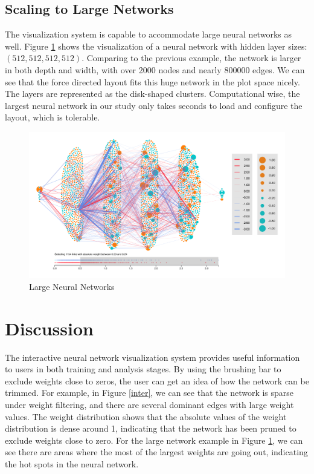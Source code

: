 \documentclass[sigchi]{acmart}
\begin{document}
\subsection{Scaling to Large Networks}
The visualization system is capable to accommodate large neural networks as well. Figure \ref{max} shows the visualization of a neural network with hidden layer sizes: $( 512, 512, 512, 512)$. Comparing to the previous example, the network is larger in both depth and width, with over 2000 nodes and nearly 800000 edges. We can see that the force directed layout fits this huge network in the plot space nicely. The layers are represented as the disk-shaped clusters. Computational wise, the largest neural network in our study only takes seconds to load and configure the layout, which is tolerable.

\begin{figure}[h]
  \centering
  \includegraphics[width=\linewidth]{NNmax1.png}
  \caption{Large Neural Networks}
  \label{max}
\end{figure}

\section{Discussion}
The interactive neural network visualization system provides useful information to users in both training and analysis stages. By using the brushing bar to exclude weights close to zeros, the user can get an idea of how the network can be trimmed. For example, in Figure \ref{inter}, we can see that the network is sparse under weight filtering, and there are several dominant edges with large weight values. The weight distribution shows that the absolute values of the weight distribution is dense around 1, indicating that the network has been pruned to exclude weights close to zero. For the large network example in Figure \ref{max}, we can see there are areas where the most of the largest weights are going out, indicating the hot spots in the neural network. \\
\end{document}
